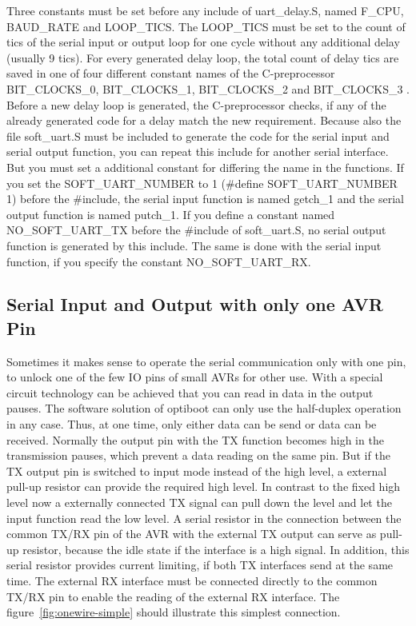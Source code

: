 Three constants must be set before any include of uart\_delay.S, named F\_CPU, BAUD\_RATE and 
LOOP\_TICS. The LOOP\_TICS must be set to the count of tics of the serial input or output
loop for one cycle without any additional delay (usually 9 tics).
For every generated delay loop, the total count of delay tics are saved in one of four
different constant names of the C-preprocessor BIT\_CLOCKS\_0, BIT\_CLOCKS\_1,
BIT\_CLOCKS\_2 and BIT\_CLOCKS\_3 . 
Before a new delay loop is generated, the C-preprocessor checks, if any of the already
generated code for a delay match the new requirement.
Because also the file soft\_uart.S must be included to generate the code for the 
serial input and serial output function, you can repeat this include for another
serial interface. But you must set a additional constant for differing the name
in the functions.
If you set the SOFT\_UART\_NUMBER to 1 (\#define SOFT\_UART\_NUMBER 1) before the \#include,
the serial input function is named getch\_1 and the serial output function
is named putch\_1. If you define a constant named NO\_SOFT\_UART\_TX before the
\#include of soft\_uart.S, no serial output function is generated by this include.
The same is done with the serial input function, if you specify the constant NO\_SOFT\_UART\_RX.

\subsection{Serial Input and Output with only one AVR Pin}

Sometimes it makes sense to operate the serial communication only with one pin,
to unlock one of the few IO pins of small AVRs for other use.
With a special circuit technology can be achieved that you can read in data in the
output pauses. The software solution of optiboot can only use the half-duplex operation
in any case.
Thus, at one time, only either data can be send or data can be received.
Normally the output pin with the TX function becomes high in the transmission pauses,
which prevent a data reading on the same pin.
But if the TX output pin is switched to input mode instead of the high level,
a external pull-up resistor can provide the required high level.
In contrast to the fixed high level now a externally connected TX signal
can pull down the level and let the input function read the low level.
A serial resistor in the connection between the common TX/RX pin of the AVR
with the external TX output can serve as pull-up resistor,
because the idle state if the interface is a high signal.
In addition, this serial resistor provides current limiting,
if both TX interfaces send at the same time.
The external RX interface must be connected directly to the common TX/RX pin
to enable the reading of the external RX interface.
The figure~\ref{fig:onewire-simple} should illustrate this simplest connection.

